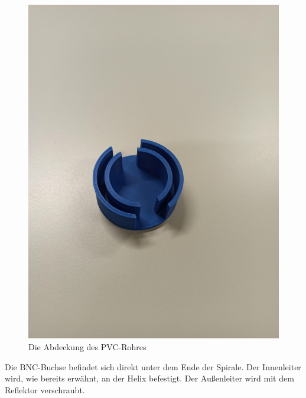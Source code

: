 \begin{figure}[h!]
	\centering
	\includegraphics[width=\textwidth]{../ref/Abdeckung-PVC-Rohr.jpg}
	\caption{Die Abdeckung des PVC-Rohres}
	\label{fig:PVC-Rohr-Abdeckung}
\end{figure}

Die BNC-Buchse befindet sich direkt unter dem Ende der Spirale. Der Innenleiter wird, wie bereits erwähnt, an der Helix befestigt. Der Außenleiter wird mit dem Reflektor verschraubt.

